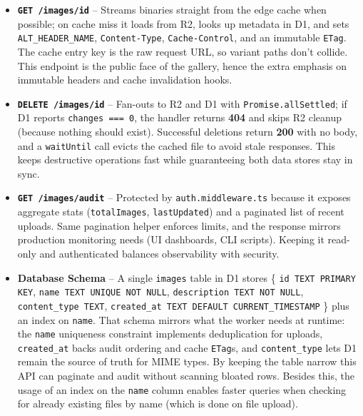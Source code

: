 \documentclass[12pt]{article}
\begin{document}
\begin{itemize}[leftmargin=*]
  \item \textbf{\texttt{GET /images/{id}}} – Streams binaries straight from the edge cache when possible; on cache miss it loads from R2, looks up metadata in D1, and sets \texttt{ALT\_HEADER\_NAME}, \texttt{Content-Type}, \texttt{Cache-Control}, and an immutable \texttt{ETag}. The cache entry key is the raw request URL, so variant paths don’t collide. This endpoint is the public face of the gallery, hence the extra emphasis on immutable headers and cache invalidation hooks.
  \item \textbf{\texttt{DELETE /images/{id}}} – Fan-outs to R2 and D1 with \texttt{Promise.allSettled}; if D1 reports \texttt{changes === 0}, the handler returns \textbf{404} and skips R2 cleanup (because nothing should exist). Successful deletions return \textbf{200} with no body, and a \texttt{waitUntil} call evicts the cached file to avoid stale responses. This keeps destructive operations fast while guaranteeing both data stores stay in sync.
  \item \textbf{\texttt{GET /images/audit}} – Protected by \texttt{auth.middleware.ts} because it exposes aggregate stats (\texttt{totalImages}, \texttt{lastUpdated}) and a paginated list of recent uploads. Same pagination helper enforces limits, and the response mirrors production monitoring needs (UI dashboards, CLI scripts). Keeping it read-only and authenticated balances observability with security.
  \item \textbf{Database Schema} – A single \texttt{images} table in D1 stores \{ \texttt{id TEXT PRIMARY KEY}, \texttt{name TEXT UNIQUE NOT NULL}, \texttt{description TEXT NOT NULL}, \texttt{content\_type TEXT}, \texttt{created\_at TEXT DEFAULT CURRENT\_TIMESTAMP} \} plus an index on \texttt{name}. That schema mirrors what the worker needs at runtime: the \texttt{name} uniqueness constraint implements deduplication for uploads, \texttt{created\_at} backs audit ordering and cache \texttt{ETag}s, and \texttt{content\_type} lets D1 remain the source of truth for MIME types. By keeping the table narrow this API can paginate and audit without scanning bloated rows. Besides this, the usage of an index on the \texttt{name} column enables faster queries when checking for already existing files by name (which is done on file upload).
\end{itemize}
\end{document}
